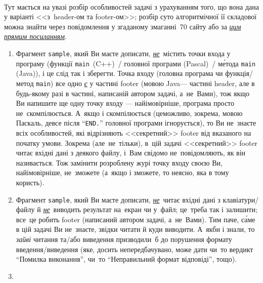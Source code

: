 ~

\smallskip

\vspace{-\baselineskip}

\Tutorial
Тут мається на увазі розбір особливостей задачі з урахуванням того, що вона дана у варіанті <<з~\mbox{header-ом} та \mbox{footer-ом}>>; розбір суто алгоритмічної її складової можна знайти через повідомлення у згаданому змаганні~70 сайту \EjudgeCkipoName{} або за \href{https://ejudge.ckipo.edu.ua/coll_new_A4_11pt.pdf#page=108}{\emph{цим прямим посиланням}}.

\begin{enumerate}
\item
Фрагмент \texttt{sample}, який Ви маєте дописати, \underline{\emph{не}}~містить точки входа у програму (функції \texttt{main}~(C++)~/ головної програми (Pascal)~/ м\'{е}тода \texttt{main} (Java)), і це слід так і зберегти. Точка входу (головна програма чи функція/\nolinebreak[2]метод \texttt{main}) все одно \underline{\emph{є}} у частині footer (мовою Java\nolinebreak[3] --- частині header, але в будь-якому разі в частині, написаній автором задачі, а~не~Вами), тож якщо Ви напишите ще одну точку входу --- найімовірніше, програма просто не~скомпілюється. А~якщо і скомпілюється (це\nolinebreak[3] можливо, зокрема, мовою Паскаль, де\nolinebreak[2] все після ``\texttt{END.}'' головної програми ігнорується), то Ви не~знаєте всіх особливостей, які відрізняють <<секретний>> footer від вказаного на початку умови. Зокрема (але~не~тільки), в~цій задачі <<секретний>> footer читає вхідні дані з деякого файлу, і~Вам свідомо не~повідомляють, як він називається. Тож замінити розроблену журі точку входу своєю Ви, найімовірніше, не~зможете (а~якщо і зможете, то неясно, яка в тому користь).
\item
Фрагмент \texttt{sample}, який Ви маєте дописати, \underline{\emph{не}}~читає вхідні дані з клавіатури/\nolinebreak[2]файлу й \underline{\emph{не}}~виводить результат на~екран чи у~файл; це~треба так і залишити; все~це робить footer (написаний автором задачі, а~не~Вами). Тим паче, с\'{а}ме в цій задачі Ви не~знаєте, звідки читати й куди виводити. А~якби і знали, то \emph{зайві} читання та/або виведення призводили~б до порушення формату введення/\nolinebreak[3]виведення (яке, досить непередбачувано, може дати чи~то вердикт ``Помилка виконання'', чи~то ``Неправильний формат відповіді'', %
тощо).
\item

\end{enumerate}
